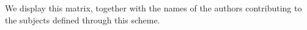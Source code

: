 We display this matrix, together with the names of the authors contributing to the subjects defined through this scheme.
